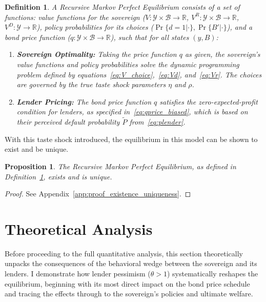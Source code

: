 \documentclass[12pt]{article}
\theoremstyle{plain}
\newtheorem{definition}{Definition}
\newtheorem{proposition}{Proposition}
\begin{document}
\begin{definition}
	\label{def:equilibrium}
	A Recursive Markov Perfect Equilibrium consists of a set of functions: value functions for the sovereign ($V:\mathcal{Y}\times\mathcal{B}\to\mathbb{R}$, $V^R:\mathcal{Y}\times\mathcal{B}\to\mathbb{R}$, $V^D:\mathcal{Y}\to\mathbb{R}$), policy probabilities for its choices ($\Pr\{d=1|\cdot\}, \Pr\{B'|\cdot\}$), and a bond price function ($q:\mathcal{Y}\times\mathcal{B}\to\mathbb{R}$), such that for all states $(y, B)$:
	\begin{enumerate}
		\item \textbf{Sovereign Optimality:} Taking the price function $q$ as given, the sovereign's value functions and policy probabilities solve the dynamic programming problem defined by equations~\eqref{eq:V_choice},~\eqref{eq:Vd}, and~\eqref{eq:Vr}. The choices are governed by the true taste shock parameters $\eta$ and $\rho$.
		\item \textbf{Lender Pricing:} The bond price function $q$ satisfies the zero-expected-profit condition for lenders, as specified in~\eqref{eq:qprice_biased}, which is based on their perceived default probability $\tilde{P}$ from~\eqref{eq:plender}.
	\end{enumerate}
\end{definition}

With this taste shock introduced, the equilibrium in this model can be shown to
exist and be unique.
\begin{proposition}\label{prop:existence_uniqueness}
	The Recursive Markov Perfect Equilibrium, as defined in Definition~\ref{def:equilibrium}, exists and is unique.
\end{proposition}

\begin{proof}
	See Appendix~\ref{app:proof_existence_uniqueness}.
\end{proof}

\section{Theoretical Analysis}
\label{sec:theory}

Before proceeding to the full quantitative analysis, this section theoretically
unpacks the consequences of the behavioral wedge between the sovereign and its
lenders. I demonstrate how lender pessimism ($\theta > 1$) systematically
reshapes the equilibrium, beginning with its most direct impact on the bond
price schedule and tracing the effects through to the sovereign's policies and
ultimate welfare.
\end{document}
